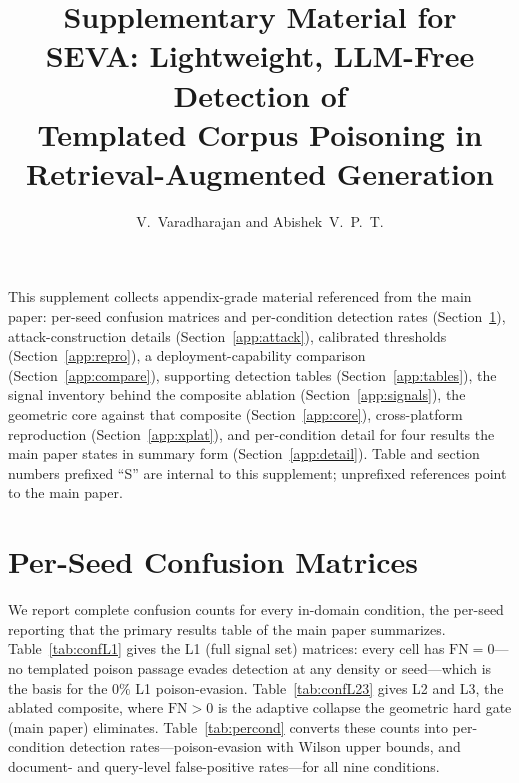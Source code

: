 \documentclass[lettersize,journal]{IEEEtran}
\begin{document}
\title{Supplementary Material for\\
SEVA: Lightweight, LLM-Free Detection of\\
Templated Corpus Poisoning in\\
Retrieval-Augmented Generation}

\author{V.~Varadharajan and Abishek~V.~P.~T.}

\maketitle

\noindent This supplement collects appendix-grade material referenced from the main
paper: per-seed confusion matrices and per-condition detection rates
(Section~\ref{app:confusion}), attack-construction details (Section~\ref{app:attack}),
calibrated thresholds (Section~\ref{app:repro}), a deployment-capability comparison
(Section~\ref{app:compare}), supporting detection tables (Section~\ref{app:tables}), the
signal inventory behind the composite ablation (Section~\ref{app:signals}),
the geometric core against that composite (Section~\ref{app:core}),
cross-platform reproduction (Section~\ref{app:xplat}), and per-condition
detail for four results the main paper states in summary form
(Section~\ref{app:detail}). Table
and section numbers prefixed ``S'' are internal to this supplement; unprefixed references
point to the main paper.

\section{Per-Seed Confusion Matrices}
\label{app:confusion}
We report complete confusion counts for every in-domain condition, the per-seed
reporting that the primary results table of the main paper summarizes. Table~\ref{tab:confL1}
gives the L1 (full signal set) matrices: every cell has $\mathrm{FN}=0$---no
templated poison passage evades detection at any density or seed---which is the
basis for the $0\%$ L1 poison-evasion. Table~\ref{tab:confL23} gives L2 and L3, the
ablated composite, where $\mathrm{FN}>0$ is the adaptive collapse the geometric hard
gate (main paper) eliminates. Table~\ref{tab:percond} converts these
counts into per-condition detection rates---poison-evasion with Wilson upper bounds,
and document- and query-level false-positive rates---for all nine conditions.
\end{document}
